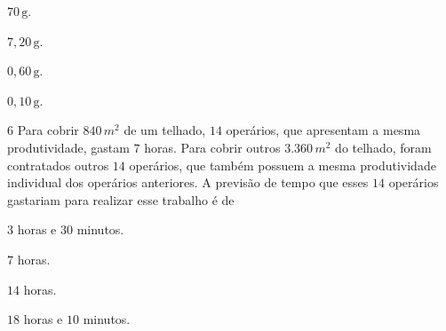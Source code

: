 \begin{escolha}
\item $70\,\text{g}$.
\item $7,20\,\text{g}$.
\item $0,60\,\text{g}$.
\item $0,10\,\text{g}$.
\end{escolha}



\num{6}  Para cobrir $840\,m^2$ de um telhado, $14$ operários, que apresentam a
mesma produtividade, gastam $7$ horas. Para cobrir outros $3.360\,m^2$ do
telhado, foram contratados outros $14$ operários, que também possuem a
mesma produtividade individual dos operários anteriores. A previsão de
tempo que esses $14$ operários gastariam para realizar esse trabalho é de

\begin{escolha}
\item $3$ horas e $30$ minutos.
\item $7$ horas.
\item $14$ horas.
\item $18$ horas e $10$ minutos.
\end{escolha}

